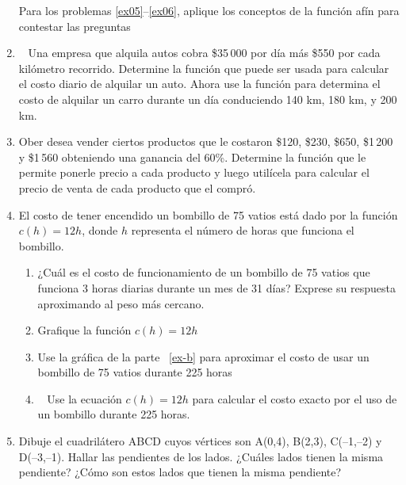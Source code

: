 \documentclass[letterpaper,11pt,twoside]{article}
\begin{document}
\begin{multicols}{2}
\begin{enumerate}
Para los problemas \ref{ex05}--\ref{ex06}, aplique los conceptos de la función afín para contestar las preguntas
\item ~\label{ex05} Una empresa que alquila autos cobra \$35\,000 por día más \$550 por cada kilómetro recorrido. Determine la función que puede ser usada para calcular el costo diario de alquilar un auto. Ahora use la función para determina el costo de alquilar un carro durante un día conduciendo 140 km, 180 km, y 200 km.
\item Ober desea vender ciertos productos que le costaron \$120, \$230, \$650, \$1\,200 y \$1\,560 obteniendo una ganancia del 60\%. Determine la función que le permite ponerle precio a cada producto y luego utilícela para calcular el precio de venta de cada producto que el compró.
\item El costo de tener encendido un bombillo de 75 vatios está dado por la función $c(h)=12h$, donde $h$ representa el número de horas que funciona el bombillo.
\begin{enumerate}
\item ¿Cuál es el costo de funcionamiento de un bombillo de 75 vatios que funciona 3 horas diarias durante un mes de 31 días? Exprese su respuesta aproximando al peso más cercano.
\item Grafique la función $c(h)=12h$ \label{ex-b}
\item Use la gráfica de la parte ~\ref{ex-b} para aproximar el costo de usar un bombillo de 75 vatios durante 225 horas
\item ~\label{ex06} Use la ecuación $c(h)=12h$ para calcular el costo exacto por el uso de un bombillo durante 225 horas.
\end{enumerate}
\item Dibuje el cuadrilátero ABCD cuyos vértices son A(0,4), B(2,3), C(--1,--2) y D(--3,--1). Hallar las pendientes de los lados. ¿Cuáles lados tienen la misma pendiente? ¿Cómo son estos lados que tienen la misma pendiente?
 \end{enumerate}
 \end{multicols}
\end{document}
